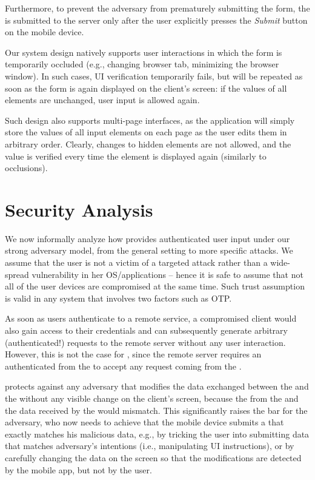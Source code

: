 Furthermore, to prevent the adversary from prematurely submitting the form, the \POI is submitted to the server only after the user explicitly presses the \emph{Submit} button on the mobile device.


Our system design natively supports user interactions in which the form is temporarily occluded (e.g., changing browser tab, minimizing the browser window).
In such cases, UI verification temporarily fails, but will be repeated as soon as the form is again displayed on the client's screen: if the values of all elements are unchanged, user input is allowed again.

Such design also supports multi-page interfaces, as the application will simply store the values of all input elements on each page as the user edits them in arbitrary order.
Clearly, changes to hidden elements are not allowed, and the value is verified every time the element is displayed again (similarly to occlusions).


 \section{Security Analysis} \label{sec:securityAnalysis}

We now informally analyze how \sysname provides authenticated user input under our strong adversary model, from the general setting to more specific attacks.
We assume that the user is not a victim of a targeted attack rather than a wide-spread vulnerability in her OS/applications -- hence it is safe to assume that not all of the user devices are compromised at the same time. Such trust assumption is valid in any system that involves two factors such as OTP.

As soon as users authenticate to a remote service, a compromised client would also gain access to their credentials and can subsequently generate arbitrary (authenticated!) requests to the remote server without any user interaction.
However, this is not the case for \sysname, since the remote server requires an authenticated \POI from the \app to accept any request coming from the \client.


\sysname protects against any adversary that modifies the data exchanged between the \client and the \server without any visible change on the client's screen, because the \POI from the \app and the data received by the \server would mismatch.
This significantly raises the bar for the adversary, who now needs to achieve that the mobile device submits a \POI that exactly matches his malicious data, e.g.,  by tricking the user into submitting data that matches adversary's intentions (i.e., manipulating UI instructions), or by carefully changing the data on the screen so that the modifications are detected by the mobile app, but not by the user.


